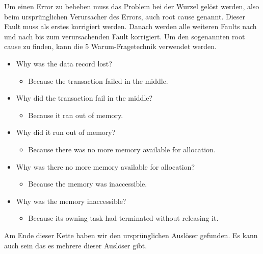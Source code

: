 Um einen Error zu beheben muss das Problem bei der Wurzel gelöst werden, also beim ursprünglichen Verursacher des Errors, auch root cause genannt. Dieser Fault muss als erstes korrigiert werden. Danach werden alle weiteren Faults nach und nach bis zum verursachenden Fault korrigiert. Um den sogenannten root cause zu finden, kann die 5 Warum-Fragetechnik verwendet werden.

\begin{itemize}
	\item Why was the data record lost?
	\begin{itemize}
		\item Because the transaction failed in the middle.
	\end{itemize}
	\item Why did the transaction fail in the middle?
	\begin{itemize}
		\item Because it ran out of memory.
	\end{itemize}
	\item Why did it run out of memory?
	\begin{itemize}
		\item Because there was no more memory available for allocation.
	\end{itemize}
	\item Why was there no more memory available for allocation?
	\begin{itemize}
		\item Because the memory was inaccessible.
	\end{itemize}
	\item Why was the memory inaccessible?
	\begin{itemize}
		\item Because its owning task had terminated without releasing it.
	\end{itemize}
\end{itemize}

Am Ende dieser Kette haben wir den ursprünglichen Auslöser gefunden. Es kann auch sein das es mehrere dieser Auslöser gibt.
